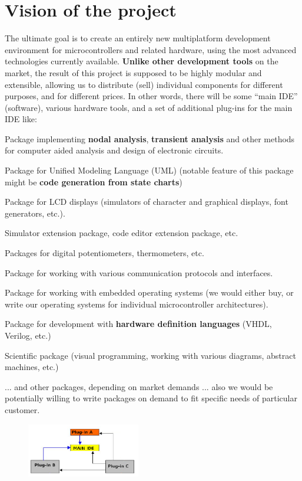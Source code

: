 \documentclass[a4paper,twoside,15pt]{book}
\begin{document}
	\section{Vision of the project}
		The ultimate goal is to create an entirely new multiplatform development environment for microcontrollers and related hardware, using the most advanced technologies currently available. \textbf{Unlike other development tools} on the market, the result of this project is supposed to be highly modular and extensible, allowing us to distribute (sell) individual components for different purposes, and for different prices. In other words, there will be some ``main IDE'' (software), various hardware tools, and a set of additional plug-ins for the main IDE like:
		\begin{dinglist}{73}
			\item Package implementing \textbf{nodal analysis}, \textbf{transient analysis} and other methods for computer aided analysis and design of electronic circuits.
			\item Package for Unified Modeling Language (UML) (notable feature of this package might be \textbf{code generation from state charts})
			\item Package for LCD displays (simulators of character and graphical displays, font generators, etc.).
			\item Simulator extension package, code editor extension package, etc.
			\item Packages for digital potentiometers, thermometers, etc.
			\item Package for working with various communication protocols and interfaces.
			\item Package for working with embedded operating systems (we would either buy, or write our operating systems for individual microcontroller architectures).
			\item Package for development with \textbf{hardware definition languages} (VHDL, Verilog, etc.)
			\item Scientific package (visual programming, working with various diagrams, abstract machines, etc.)
			\item ... and other packages, depending on market demands ... also we would be potentially willing to write packages on demand to fit specific needs of particular customer.
		\end{dinglist}

		\begin{figure}
			\centering{}
			\includegraphics[width=140pt]{images/a_diagram.png}
		\end{figure}
\end{document}
